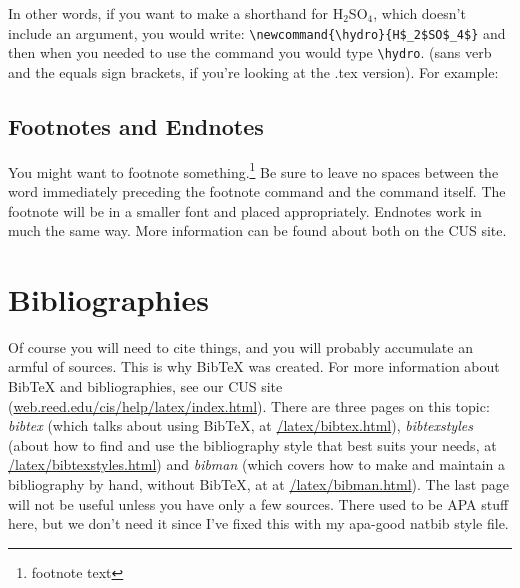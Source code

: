 \documentclass[12pt,twoside]{reedthesis}
\theoremstyle{plain}   %
\theoremstyle{definition}
\theoremstyle{remark}
\numberwithin{equation}{section}
\begin{document}
In other words, if you want to make a shorthand for H$_2$SO$_4$, which doesn't include an argument, you would write: \verb=\newcommand{\hydro}{H$_2$SO$_4$}= and then when you needed  to use the command you would type \verb=\hydro=. (sans verb and the equals sign brackets, if you're looking at the .tex version). For example: \hydro

\subsection{Footnotes and Endnotes}
	You might want to footnote something.\footnote{footnote text} Be sure to leave no spaces between the word immediately preceding the footnote command and the command itself. The footnote will be in a smaller font and placed appropriately. Endnotes work in much the same way. More information can be found about both on the CUS site.
	
\section{Bibliographies}
	Of course you will need to cite things, and you will probably accumulate an armful of sources. This is why BibTeX was created. For more information about BibTeX and bibliographies, see our CUS site (\url{web.reed.edu/cis/help/latex/index.html}). There are three pages on this topic: {\it bibtex} (which talks about using BibTeX, at \url{/latex/bibtex.html}), {\it bibtexstyles} (about how to find and use the bibliography style that best suits your needs, at \url{/latex/bibtexstyles.html}) and {\it bibman} (which covers how to make and maintain a bibliography by hand, without BibTeX, at at \url{/latex/bibman.html}). The last page will not be useful unless you have only a few sources. There used to be APA stuff here, but we don't need it since I've fixed this with my apa-good natbib style file.
	
\end{document}
